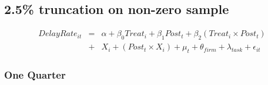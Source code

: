 \documentclass[
]{article}
\begin{document}
\hypertarget{truncation-on-non-zero-sample}{%
\subsection{2.5\% truncation on non-zero
sample}\label{truncation-on-non-zero-sample}}

\[ \begin{aligned} DelayRate_{it} &=& \alpha+\beta_0 Treat_i + \beta_1 Post_t + \beta_2 (Treat_i \times Post_t)\\
&+&  X_i + (Post_t \times X_i) + \mu_t + \theta_{firm} + \lambda_{task}+ \epsilon_{it}
\end{aligned}\]

\hypertarget{one-quarter-6}{%
\subsubsection{One Quarter}\label{one-quarter-6}}
\end{document}
